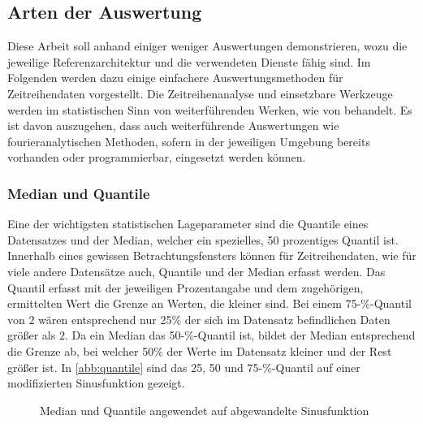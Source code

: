 \subsection{Arten der Auswertung}\label{chap:auswertungsarten}
Diese Arbeit soll anhand einiger weniger Auswertungen demonstrieren, wozu die jeweilige Referenzarchitektur und die verwendeten Dienste fähig sind. Im Folgenden werden dazu einige einfachere Auswertungsmethoden für Zeitreihendaten vorgestellt. Die Zeitreihenanalyse und einsetzbare Werkzeuge werden im statistischen Sinn von weiterführenden Werken, wie von \citeauthor{Shumway.2017} behandelt. Es ist davon auszugehen, dass auch weiterführende Auswertungen wie fourieranalytischen Methoden, sofern in der jeweiligen Umgebung bereits vorhanden oder programmierbar, eingesetzt werden können.


\subsubsection{Median und Quantile}
Eine der wichtigsten statistischen Lageparameter sind die Quantile eines Datensatzes und der Median, welcher ein spezielles, 50 prozentiges Quantil ist. 
Innerhalb eines gewissen Betrachtungsfensters können für Zeitreihendaten, wie für viele andere Datensätze auch, Quantile und der Median erfasst werden. 
Das Quantil erfasst mit der jeweiligen Prozentangabe und dem zugehörigen, ermittelten Wert die Grenze an Werten, die kleiner sind. 
Bei einem 75-\%-Quantil von $2$ wären entsprechend nur 25\% der sich im Datensatz befindlichen Daten größer als $2$. 
Da ein Median das 50-\%-Quantil ist, bildet der Median entsprechend die Grenze ab, bei welcher 50\% der Werte im Datensatz kleiner und der Rest größer ist. In \autoref{abb:quantile} sind das 25, 50 und 75-\%-Quantil auf einer modifizierten Sinusfunktion gezeigt.
\begin{figure}[H]
\centering
{}
\caption{Median und Quantile angewendet auf abgewandelte Sinusfunktion}
\label{abb:quantile}
\end{figure}

